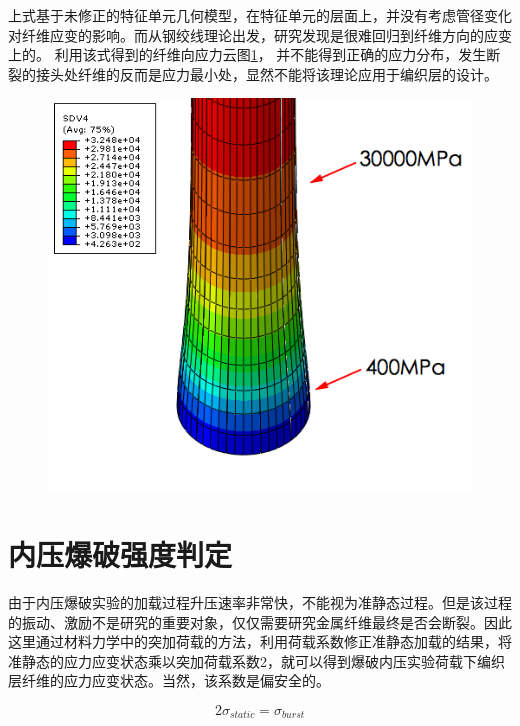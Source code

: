 上式基于未修正的特征单元几何模型，在特征单元的层面上，并没有考虑管径变化对纤维应变的影响。而从钢绞线理论出发，研究发现是很难回归到纤维方向的应变上的。
利用该式得到的纤维向应力云图\ref{fig:hose-strength002}， 
并不能得到正确的应力分布，发生断裂的接头处纤维的反而是应力最小处，显然不能将该理论应用于编织层的设计。
\begin{figure}[!htp]
	\centering
	\includegraphics[height=0.26\textheight]{figure/chap6/hose-strength002}
	\label{fig:hose-strength002}
\end{figure}

 






\section{内压爆破强度判定}

由于内压爆破实验的加载过程升压速率非常快，不能视为准静态过程。但是该过程的振动、激励不是研究的重要对象，仅仅需要研究金属纤维最终是否会断裂。因此这里通过材料力学中的突加荷载的方法，利用荷载系数修正准静态加载的结果，将准静态的应力应变状态乘以突加荷载系数2，就可以得到爆破内压实验荷载下编织层纤维的应力应变状态。当然，该系数是偏安全的。

\begin{equation}
2\sigma _{static}= \sigma _{burst}
\end{equation}

